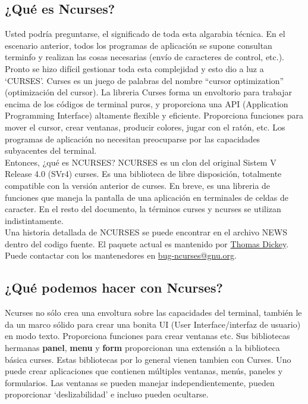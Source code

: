 \documentclass{article}
\begin{document}
\subsection{¿Qué es Ncurses?}%
Usted podría preguntarse, el significado de toda esta algarabia técnica. En el
escenario anterior, todos los programas de aplicación se supone consultan
terminfo y realizan las cosas necesarias (envío de caracteres de control,
etc.). Pronto se hizo difícil gestionar toda esta complejidad y esto dio a luz
a ‘CURSES’. Curses es un juego de palabras del nombre “cursor optimization”
(optimización del cursor). La libreria Curses forma un envoltorio para trabajar
encima de los códigos de terminal puros, y proporciona una API (Application
Programming Interface) altamente flexible y eficiente. Proporciona funciones
para mover el cursor, crear ventanas, producir colores, jugar con el ratón,
etc. Los programas de aplicación no necesitan preocuparse por las capacidades
subyacentes del terminal.\\

Entonces, ¿qué es NCURSES? NCURSES es un clon del original Sistem V Release 4.0
(SVr4) curses. Es una biblioteca de libre disposición, totalmente compatible
con la versión anterior de curses. En breve, es una libreria de funciones que
maneja la pantalla de una aplicación en terminales de celdas de caracter. En el
resto del documento, la términos curses y ncurses se utilizan indistintamente.\\

Una historia detallada de NCURSES se puede encontrar en el archivo NEWS dentro
del codigo fuente. El paquete actual es mantenido por
\href{to:dickey@his.com}{Thomas Dickey}. Puede contactar con los mantenedores
en \href{to:bug-ncurses@gnu.org}{bug-ncurses@gnu.org}.\\

\subsection{¿Qué podemos hacer con Ncurses?}%
Ncurses no sólo crea una envoltura sobre las capacidades del terminal, también
le da un marco sólido para crear una bonita UI (User Interface/interfaz de
usuario) en modo texto. Proporciona funciones para crear ventanas etc. Sus
bibliotecas hermanas \textbf{panel}, \textbf{menu} y \textbf{form} proporcionan
una extensión a la biblioteca básica curses. Estas bibliotecas por lo general
vienen tambien con Curses. Uno puede crear aplicaciones que contienen múltiples
ventanas, menús, paneles y formularios. Las ventanas se pueden manejar
independientemente, pueden proporcionar ‘deslizabilidad’ e incluso pueden
ocultarse.\\
\end{document}
